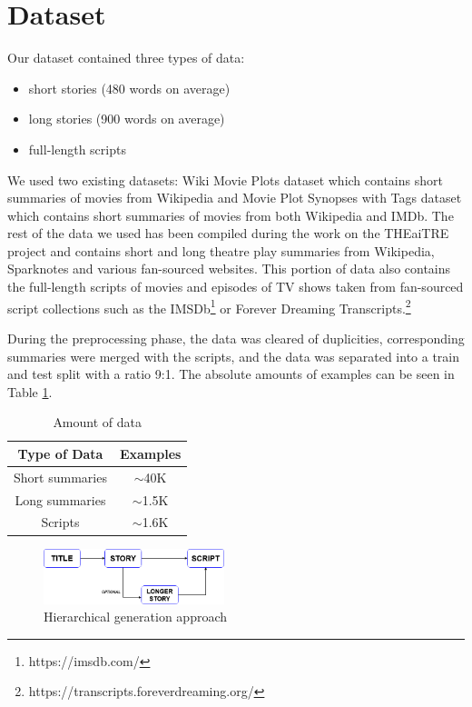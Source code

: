 \documentclass[11pt,a4paper]{article}
\begin{document}
\section{Dataset}
\label{sec:data}
Our dataset contained three types of data:
\begin{itemize}
    \item short stories (480 words on average)
    \item long stories (900 words on average)
    \item full-length scripts
\end{itemize}
We used two existing datasets: Wiki Movie Plots dataset \citep{wikidataset} which contains short summaries of movies from Wikipedia and Movie Plot Synopses with Tags dataset \citep{movieplotdataset} which contains short summaries of movies from both Wikipedia and IMDb. The rest of the data we used has been compiled during the work on the THEaiTRE project \citep{theaitre} and contains short and long theatre play summaries from Wikipedia, Sparknotes and various fan-sourced websites. This portion of data also contains the full-length scripts of movies and episodes of TV shows taken from fan-sourced script collections such as the IMSDb\footnote{https://imsdb.com/} or Forever Dreaming Transcripts.\footnote{https://transcripts.foreverdreaming.org/}

During the preprocessing phase, the data was cleared of duplicities, corresponding summaries were merged with the scripts, and the data was separated into a train and test split with a ratio 9:1. The absolute amounts of examples can be seen in Table \ref{tab:data}.

\begin{table}[]
    \centering
    \begin{tabular}{c|c}
    \textbf{Type of Data}  & \textbf{Examples}  \\\hline
    Short summaries     & $\sim$40K \\
    Long summaries & $\sim$1.5K \\
    Scripts & $\sim$1.6K
    \end{tabular}
    \caption{Amount of data}
    \label{tab:data}
\end{table}

\begin{figure}
    \centering
    \includegraphics[width=0.47\textwidth]{flowchart.png}
    \caption{Hierarchical generation approach}
    \label{fig:flowchart}
\end{figure}
\end{document}
